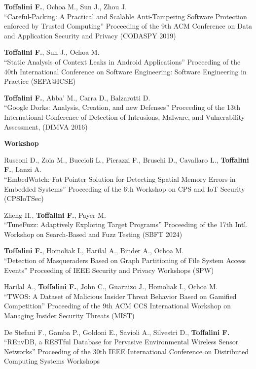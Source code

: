 \begin{enumerate}[label={[C\arabic*]},leftmargin=5mm]
\item \textbf{Toffalini F.}, Ochoa M., Sun J., Zhou J.\\``Careful-Packing: A Practical and Scalable Anti-Tampering Software Protection enforced by Trusted Computing'' Proceeding of the 9th ACM Conference on Data and Application Security and Privacy (CODASPY 2019)
\item \textbf{Toffalini F.}, Sun J., Ochoa M.\\``Static Analysis of Context Leaks in Android Applications'' Proceeding of the 40th International Conference on Software Engineering: Software Engineering in Practice (SEPA@ICSE)
\item \textbf{Toffalini F.}, Abba' M., Carra D., Balzarotti D.\\``Google Dorks: Analysis, Creation, and new Defenses'' Proceeding of the 13th International Conference of Detection of Intrusions, Malware, and Vulnerability Assessment, (DIMVA 2016)
\end{enumerate}
\textbf{Workshop}\begin{enumerate}[label={[W\arabic*]},leftmargin=5mm]
\item Rusconi D., Zoia M., Buccioli L., Pierazzi F., Bruschi D., Cavallaro L., \textbf{Toffalini F.}, Lanzi A.\\``EmbedWatch: Fat Pointer Solution for Detecting Spatial Memory Errors in Embedded Systems'' Proceeding of the 6th Workshop on CPS and IoT Security (CPSIoTSec)
\item Zheng H., \textbf{Toffalini F.}, Payer M.\\``TuneFuzz: Adaptively Exploring Target Programs'' Proceeding of the 17th Intl. Workshop on Search-Based and Fuzz Testing (SBFT 2024)
\item \textbf{Toffalini F.}, Homoliak I., Harilal A., Binder A., Ochoa M.\\``Detection of Masqueraders Based on Graph Partitioning of File System Access Events'' Proceeding of IEEE Security and Privacy Workshops (SPW)
\item Harilal A., \textbf{Toffalini F.}, John C., Guarnizo J., Homoliak I., Ochoa M.\\``TWOS: A Dataset of Malicious Insider Threat Behavior Based on Gamified Competition'' Proceeding of the 9th ACM CCS International Workshop on Managing Insider Security Threats (MIST)
\item De Stefani F., Gamba P., Goldoni E., Savioli A., Silvestri D., \textbf{Toffalini F.}\\``REnvDB, a RESTful Database for Pervasive Environmental Wireless Sensor Networks'' Proceeding of the 30th IEEE International Conference on Distributed Computing Systems Workshops
\end{enumerate}

